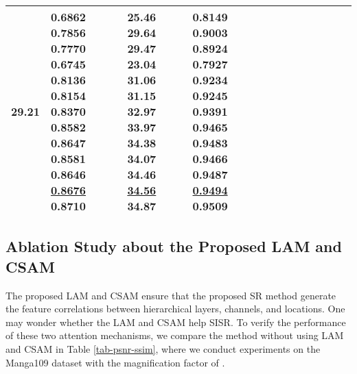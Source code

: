 \documentclass[runningheads]{llncs}
\begin{document}
\begin{table}[t]
\begin{tabular}{|p{6.5em}|p{2.5em}|p{2.5em}|p{3em}|p{2.5em}|p{3em}|p{2.5em}|p{3em}|p{2.5em}|p{3em}|p{2.5em}|p{3em}|}
\newline{}\bfseries{29.21}  & 0.6862 \newline{}0.7856 \newline{}0.7770 \newline{}0.6745 \newline{}0.8136 \newline{}0.8154 \newline{}0.8370 \newline{}0.8582 \newline{}0.8647 \newline{}0.8581 \newline{}0.8646 \newline{}\underline{0.8676} \newline{}\bfseries{0.8710}  &25.46 \newline{}29.64 \newline{}29.47 \newline{}23.04 \newline{}31.06 \newline{}31.15 \newline{}32.97 \newline{}33.97 \newline{}34.38 \newline{}34.07 \newline{}34.46 \newline{}\underline{34.56} \newline{}\bfseries{34.87} &0.8149\newline{} 0.9003\newline{} 0.8924\newline{} 0.7927\newline{} 0.9234\newline{} 0.9245\newline{} 0.9391\newline{} 0.9465\newline{} 0.9483 \newline{} 0.9466 \newline{} 0.9487 \newline{}\underline{0.9494} \newline{}\bfseries{0.9509} \\
		\hline
	\end{tabular}\label{tab-BD}\end{table}



\subsection{Ablation Study about the Proposed LAM and CSAM}
The proposed LAM and CSAM ensure that the proposed SR method generate the feature correlations between hierarchical layers, channels, and locations. One may wonder whether the LAM and CSAM help SISR.
To verify the performance of these two attention mechanisms, we compare the method without using LAM and CSAM in Table \ref{tab-psnr-ssim}, where we conduct experiments on the Manga109 dataset with the magnification factor of . 
\end{document}
